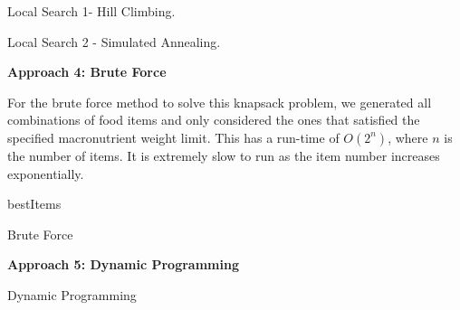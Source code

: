 \documentclass[11pt]{article}
\begin{document}
\begin{algorithm}
  \begin{algorithmic}
    \EndProcedure{}
  \end{algorithmic}
  \caption{Local Search 1- Hill Climbing.}
\end{algorithm}


\begin{algorithm}
  \begin{algorithmic}
    \EndProcedure{}
  \end{algorithmic}
  \caption{Local Search 2 - Simulated Annealing.}
\end{algorithm}

\noindent \textbf{Approach 4: Brute Force}

\noindent For the brute force method to solve this knapsack problem, we generated all combinations of food items and only considered the ones that satisfied the specified macronutrient weight limit. This has a run-time of $O(2^n)$, where $n$ is the number of items. It is extremely slow to run as the item number increases exponentially.
\vspace{2mm}
\begin{algorithm}
  \begin{algorithmic}
    
    \ENDIF
    \ENDFOR
    
    \Return bestItems
    \EndProcedure{}
  \end{algorithmic}
  \caption{Brute Force}
\end{algorithm}

\noindent \textbf{Approach 5: Dynamic Programming}



\begin{algorithm}
  \begin{algorithmic}
    \EndProcedure{}
  \end{algorithmic}
  \caption{Dynamic Programming}
\end{algorithm}
\end{document}
